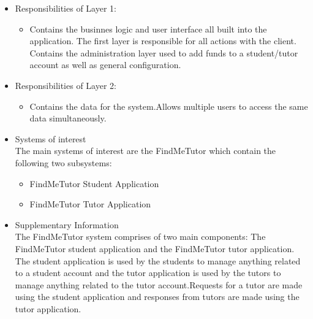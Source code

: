 \documentclass[12pt]{article}
\begin{document}
\begin{itemize}
\item Responsibilities of Layer 1:
\begin{itemize}
\item Contains the businnes logic and user interface all built into the application. The first layer is responsible for all actions with the client. Contains the administration layer used to add funds to a student/tutor account as well as general configuration.
\end{itemize}

\item Responsibilities of Layer 2:
\begin{itemize}
\item Contains the data for the system.Allows multiple users to access the same data simultaneously.
\end{itemize}

\item Systems of interest\\
The main systems of interest are the FindMeTutor which contain the following two subsystems:
\begin{itemize}
\item FindMeTutor Student Application
\item FindMeTutor Tutor Application
\end{itemize}

\item Supplementary Information\\
The FindMeTutor system comprises of two main components: The FindMeTutor student application and the FindMeTutor tutor application. The student application is used by the students to manage anything related to a student account and the tutor application is used by the tutors to manage anything related to the tutor account.Requests for a tutor are made using the student application and responses from tutors are made using the tutor application.
\end{itemize}

\pagebreak
\end{document}
